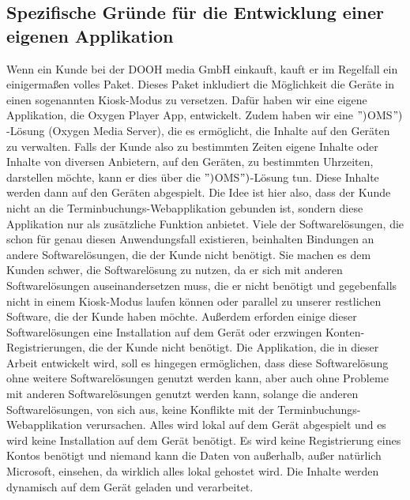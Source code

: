 \subsection{Spezifische Gründe für die Entwicklung einer eigenen Applikation}
Wenn ein Kunde bei der DOOH media GmbH einkauft, kauft er im Regelfall ein einigermaßen volles Paket.
Dieses Paket inkludiert die Möglichkeit die Geräte in einen sogenannten Kiosk-Modus zu versetzen.
Dafür haben wir eine eigene Applikation, die Oxygen Player App, entwickelt.
Zudem haben wir eine \(")\)OMS\(")\)-Lösung (Oxygen Media Server), die es ermöglicht, die Inhalte auf den Geräten zu verwalten.
Falls der Kunde also zu bestimmten Zeiten eigene Inhalte oder Inhalte von diversen Anbietern, auf den Geräten, zu bestimmten Uhrzeiten, darstellen möchte, kann er dies über die \(")\)OMS\(")\)-Lösung tun.
Diese Inhalte werden dann auf den Geräten abgespielt.
\newline
Die Idee ist hier also, dass der Kunde nicht an die Terminbuchungs-Webapplikation gebunden ist, sondern diese Applikation nur als zusätzliche Funktion anbietet.
Viele der Softwarelösungen, die schon für genau diesen Anwendungsfall existieren, beinhalten Bindungen an andere Softwarelösungen, die der Kunde nicht benötigt.
Sie machen es dem Kunden schwer, die Softwarelösung zu nutzen, da er sich mit anderen Softwarelösungen auseinandersetzen muss, die er nicht benötigt und gegebenfalls nicht in einem Kiosk-Modus laufen können oder parallel zu unserer restlichen Software, die der Kunde haben möchte.
Außerdem erforden einige dieser Softwarelösungen eine Installation auf dem Gerät oder erzwingen Konten-Registrierungen, die der Kunde nicht benötigt.
\newline
Die Applikation, die in dieser Arbeit entwickelt wird, soll es hingegen ermöglichen, dass diese Softwarelösung ohne weitere Softwarelösungen genutzt werden kann, aber auch ohne Probleme mit anderen Softwarelösungen genutzt werden kann, solange die anderen Softwarelösungen, von sich aus, keine Konflikte mit der Terminbuchungs-Webapplikation verursachen.
Alles wird lokal auf dem Gerät abgespielt und es wird keine Installation auf dem Gerät benötigt.
Es wird keine Registrierung eines Kontos benötigt und niemand kann die Daten von außerhalb, außer natürlich Microsoft, einsehen, da wirklich alles lokal gehostet wird.
Die Inhalte werden dynamisch auf dem Gerät geladen und verarbeitet.
